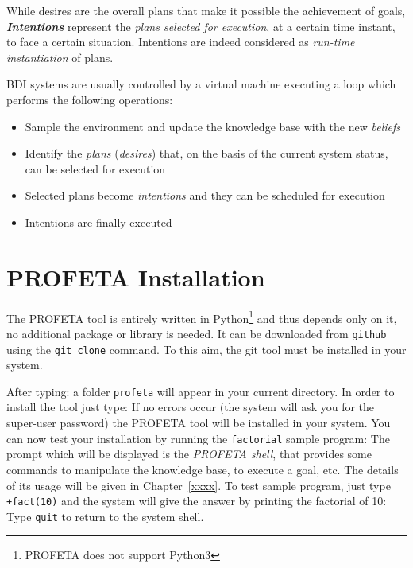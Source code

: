 While desires are the overall plans that make it possible the achievement
of goals, \textbf{\emph{Intentions}} represent the \emph{plans selected for
execution}, at a certain time instant, to face a certain situation.
Intentions are indeed considered as \emph{run-time instantiation} of plans.

BDI systems are usually controlled by a virtual machine executing a loop
which performs the following operations:
\begin{itemize}
\item Sample the environment and update the knowledge base with the new
  \emph{beliefs}
\item Identify the \emph{plans} (\emph{desires})
  that, on the basis of the current system status, can be selected for
  execution
\item Selected plans become \emph{intentions} and they can be scheduled for
  execution
\item Intentions are finally executed
\end{itemize}


\section{PROFETA Installation}
The PROFETA tool is entirely written in Python\footnote{PROFETA does not
  support Python3}  and thus depends only on it,
no additional package or library is needed.
It can be downloaded from \texttt{github} using the
\texttt{git clone} command.
To this aim, the git tool must be installed in your system.

After typing:
a folder \texttt{profeta} will appear in your current directory.
In order to install the tool just type:
If no errors occur (the system will ask you for the super-user password)
the PROFETA tool will be installed in your system.
You can now test your installation by running the \texttt{factorial} sample
program:
The prompt which will be displayed is the \emph{PROFETA shell}, that
provides some commands to manipulate the knowledge base, to execute a
goal, etc.
The details of its usage will be given in Chapter~\ref{xxxx}.
To test sample program, just type \texttt{+fact(10)} and the system will
give the answer by
printing the factorial of 10:
Type \texttt{quit} to return to the system shell.


